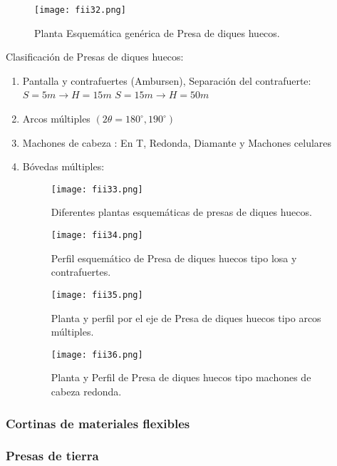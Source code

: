 \begin{figure}[h!]
	\centerline{\texttt{[image: fii32.png]}}
	\caption{ Planta Esquemática genérica de Presa de diques huecos.}
	\label{fii32}
\end{figure}

Clasificación de Presas de diques huecos:

\begin{enumerate}[noitemsep]
	\item Pantalla y contrafuertes (Ambursen), Separación del contrafuerte:
	      $ S= 5 m \longrightarrow H= 15 m$
	      $S=15m \longrightarrow H = 50 m$
	\item Arcos múltiples $( 2\theta = 180^{\circ}, 190^{\circ})$
	\item Machones de cabeza : En T, Redonda, Diamante y Machones celulares
	\item Bóvedas múltiples:
	      \begin{figure}[h!]
		      \centerline{\texttt{[image: fii33.png]}}
		      \caption{Diferentes plantas esquemáticas de presas de diques huecos.}
		      \label{fii33}
	      \end{figure}
	      \begin{figure}[h!]
		      \centerline{\texttt{[image: fii34.png]}}
		      \caption{Perfil esquemático de Presa de diques huecos tipo losa y contrafuertes.}
		      \label{fii34}
	      \end{figure}
	      \begin{figure}[h!]
		      \centerline{\texttt{[image: fii35.png]}}
		      \caption{Planta y perfil por el eje de Presa de diques huecos tipo arcos
			      múltiples.}
		      \label{fii35}
	      \end{figure}
	      \begin{figure}[h!]
		      \centerline{\texttt{[image: fii36.png]}}
		      \caption{Planta y Perfil de Presa de diques huecos tipo machones de cabeza
			      redonda.}
		      \label{fii36}
	      \end{figure}
\end{enumerate}

\subsubsection{Cortinas de materiales flexibles}

\subsubsection{Presas de tierra}

